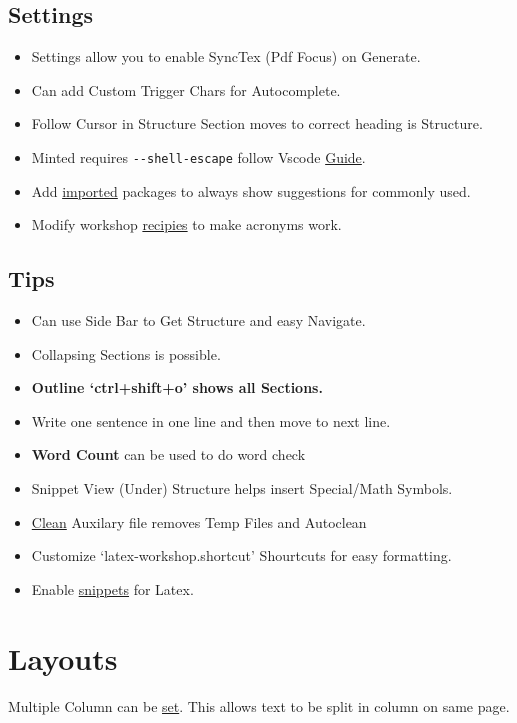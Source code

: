 \documentclass{report}[a4paper,12pt] %
\begin{document}
\subsection{Settings}
\begin{itemize}
  \item Settings allow you to enable SyncTex (Pdf Focus) on Generate.
  \item Can add Custom Trigger Chars for Autocomplete.
  \item Follow Cursor in Structure Section moves to correct heading is Structure.
  \item Minted requires \verb|--shell-escape| follow Vscode \href{https://leportella.com/minted-vscode/}{Guide}.
  \item Add \href{https://www.reddit.com/r/LaTeX/comments/pwkopy/subfile_autocompletion_in_vs_code/}{imported} packages to always show suggestions for commonly used.
  \item Modify workshop \href{https://github.com/James-Yu/LaTeX-Workshop/issues/238}{recipies} to make acronyms  work.
\end{itemize}

\subsection{Tips}
\begin{itemize}
  \item Can use Side Bar to Get Structure and easy Navigate.
  \item Collapsing Sections is possible.
  \item \textbf{Outline `ctrl+shift+o' shows all Sections.}
  \item Write one sentence in one line and then move to next line.
  \item \textbf{Word Count} can be used to do word check
  \item Snippet View (Under) Structure helps insert Special/Math Symbols.
  \item \href{https://github.com/James-Yu/LaTeX-Workshop/wiki/Compile#cleaning-generated-files}{Clean} Auxilary file removes Temp Files and Autoclean
  \item Customize `latex-workshop.shortcut' Shourtcuts for easy formatting.
  \item Enable \href{https://github.com/James-Yu/LaTeX-Workshop/issues/912}{snippets} for Latex.
\end{itemize}

\section{Layouts}
Multiple Column can be \href{https://www.overleaf.com/learn/latex/Multiple_columns}{set}. This allows text to be split in column on same page.
\end{document}
